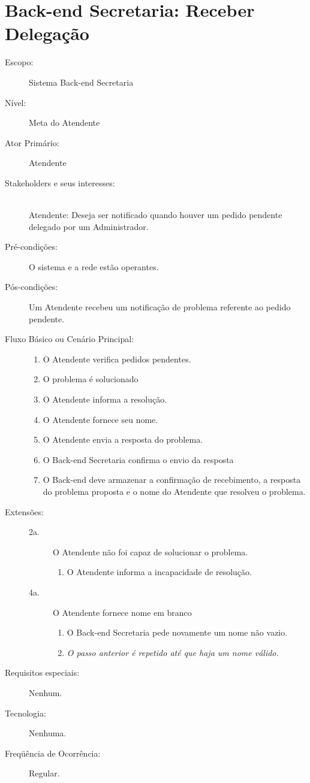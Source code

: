 \documentclass[brazil,times]{abnt}
\begin{document}
\section{Back-end Secretaria: Receber Delegação}
\label{caso-receber-delegacao}
\begin{description}
\item[Escopo:] Sistema Back-end Secretaria
\item[Nível:] Meta do Atendente
\item[Ator Primário:] Atendente
\item[Stakeholders e seus interesses:] \hfill \\
Atendente: Deseja ser notificado quando houver um pedido pendente delegado por
um Administrador.

\item[Pré-condições:] O sistema e a rede estão operantes.
\item[Pós-condições:] Um Atendente recebeu um notificação de problema referente
ao pedido pendente.
\item[Fluxo Básico ou Cenário Principal:]\hfill
\begin{enumerate}
  \item O Atendente verifica pedidos pendentes.
  \item O problema é solucionado
  \item O Atendente informa a resolução.
  \item O Atendente fornece seu nome.
  \item O Atendente envia a resposta do problema.
  \item O Back-end Secretaria confirma o envio da resposta
  \item O Back-end deve armazenar a confirmação de recebimento, a resposta
  do problema proposta e o nome do Atendente que resolveu o problema.
\end{enumerate}

\item[Extensões:]\hfill
\begin{description}
	\item[2a.] O Atendente não foi capaz de solucionar o problema.
	\begin{enumerate}
 		\item O Atendente informa a incapacidade de resolução.
	\end{enumerate} 
	
	\item[4a.] O Atendente fornece nome em branco
	\begin{enumerate}
 		\item O Back-end Secretaria pede novamente um nome não vazio.
 		\item \emph{O passo anterior é repetido até que haja um nome válido.}
	\end{enumerate} 
\end{description}
\item[Requisitos especiais:] Nenhum.
\item[Tecnologia:] Nenhuma.
\item[Freqüência de Ocorrência:] Regular.

\end{description}
\end{document}
